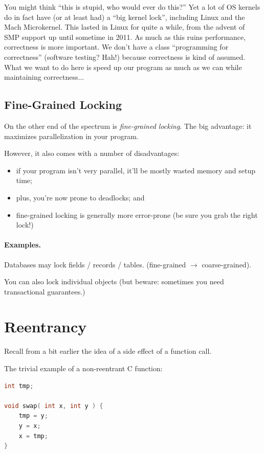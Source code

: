 \documentclass[a4paper]{report}
\begin{document}
You might think ``this is stupid, who would ever do this?'' Yet a lot of OS kernels do in fact have (or at least had) a ``big kernel lock'', including Linux and the Mach Microkernel. This lasted in Linux for quite a while, from the advent of SMP support up until sometime in 2011. As much as this ruins performance, correctness is more important. We don't have a class ``programming for correctness'' (software testing? Hah!) because correctness is kind of assumed. What we want to do here is speed up our program as much as we can while maintaining correctness...

\subsection*{Fine-Grained Locking}
On the other end of the spectrum is \emph{fine-grained locking}. The big
advantage: it maximizes parallelization in your program.

However, it also comes with a number of disadvantages:
  \begin{itemize}
    \item if your program isn't very parallel, it'll be mostly wasted memory and setup time;
    \item plus, you're now prone to deadlocks; and
    \item fine-grained locking is generally more error-prone (be sure you grab the right lock!)
  \end{itemize}

\paragraph{Examples.}

    Databases may lock fields / records / tables. (fine-grained $\rightarrow$ coarse-grained).

    You can also lock individual objects (but beware: sometimes you need transactional guarantees.)
    
\section*{Reentrancy}

Recall from a bit earlier the idea of a side effect of a function call. 

The trivial example of a non-reentrant C function:
\begin{lstlisting}[language=C]
int tmp;

void swap( int x, int y ) {
    tmp = y;
    y = x;
    x = tmp;
}
\end{lstlisting}
\end{document}
